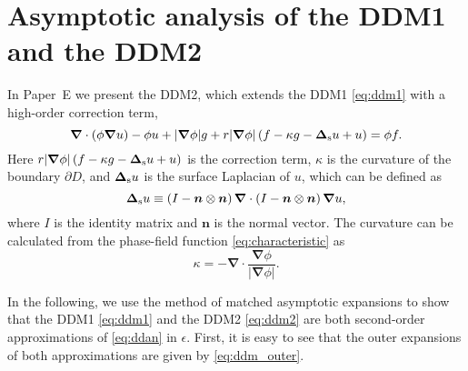 \documentclass[11pt,b5paper,DIV=calc,BCOR1.3cm,headings=small,%
               footinclude=false,headsepline]{scrbook}
\newcommand*{\vct}[1]{\ensuremath{\boldsymbol{#1}}}
\newcommand*{\del}{\boldsymbol\nabla}
\renewcommand*{\div}{\del\cdot}
\newcommand*{\grad}{\del}
\newcommand*{\lapls}{\boldsymbol\Delta_{\text s}}
\begin{document}
\section{Asymptotic analysis of the DDM1 and the DDM2}
\label{sec:DDM2}
In Paper~E we present the DDM2, which extends the DDM1 \eqref{eq:ddm1} with
a high-order correction term,
\begin{equation}
  \div\left(\phi\grad u\right) - \phi u +  |\grad\phi| g
    + r|\grad\phi|\left(f - \kappa  g - \lapls u + u\right) = \phi f.
  \label{eq:ddm2}
\end{equation}
Here $r|\grad\phi|\left(f - \kappa  g - \lapls u + u\right)$ is the
correction term, $\kappa$ is the curvature of the boundary $\partial D$, and
$\lapls u$ is the surface Laplacian of $u$, which can be defined as
\begin{equation}
  \lapls u \equiv
  \left( I - \vct n\otimes\vct n \right)
        \div \left( I - \vct n\otimes\vct n \right)\grad u,
\end{equation}
where $I$ is the identity matrix and $\vct n$ is the normal vector.  The
curvature can be calculated from the phase-field function
\eqref{eq:characteristic} as
\begin{equation}
  \kappa = -\div\frac{\grad\phi}{|\grad\phi|}.
\end{equation}

In the following, we use the method of matched asymptotic expansions to show
that the DDM1 \eqref{eq:ddm1} and the DDM2 \eqref{eq:ddm2} are both
second-order approximations of \eqref{eq:ddan} in $\epsilon$.  First, it is
easy to see that the outer expansions of both approximations are given by
\eqref{eq:ddm_outer}.
\end{document}

